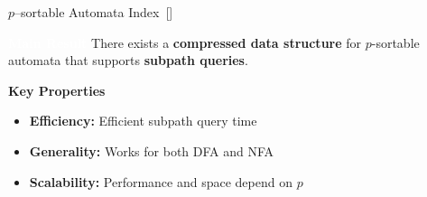 \documentclass[aspectratio=169]{beamer}
\begin{document}
\begin{frame}{$p$--sortable Automata Index~[\cite{cotumaccio2021indexing}]}

	\begin{block}{\textcolor{white}{\textbf{Main Result}}}
		There exists a \textcolor{oiGreen}{\textbf{compressed data structure}} for $p$-sortable automata that supports \textcolor{oiPurple}{\textbf{subpath queries}}.
	\end{block}

	\vspace{0.3cm}
	\textcolor{oiRed}{\textbf{Key Properties}}
	\begin{itemize}
		\item \textbf{Efficiency:} Efficient subpath query time
		\item \textbf{Generality:} Works for both DFA and NFA
		\item \textbf{Scalability:} Performance and space depend on $p$
	\end{itemize}
\end{frame}

\end{document}
